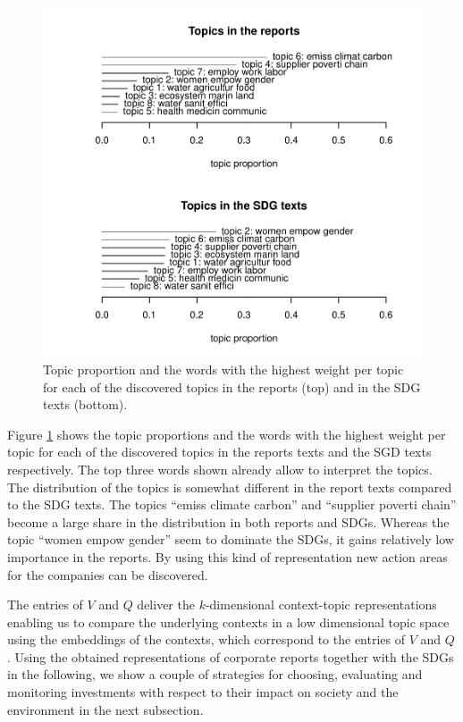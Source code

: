 \documentclass[
]{article}
\begin{document}
\begin{figure}
\includegraphics[width=0.8\linewidth]{20240314_sustain_dim_files/figure-latex/figtpropg-1} \caption{Topic proportion and the words with the highest weight per topic for each of the discovered topics in the reports (top) and in the SDG texts (bottom).}\label{fig:figtpropg}
\end{figure}

Figure \ref{fig:figtpropg} shows the topic proportions and the words with the highest weight per topic for each of the discovered topics in the reports texts and the SGD texts respectively. The top three words shown already allow to interpret the topics. The distribution of the topics is somewhat different in the report texts compared to the SDG texts. The topics ``emiss climate carbon'' and ``supplier poverti chain'' become a large share in the distribution in both reports and SDGs. Whereas the topic ``women empow gender'' seem to dominate the SDGs, it gains relatively low importance in the reports. By using this kind of representation new action areas for the companies can be discovered.

The entries of \(V\) and \(Q\) deliver the \(k\)-dimensional context-topic representations enabling us to compare the underlying contexts in a low dimensional topic space using the embeddings of the contexts, which correspond to the entries of \(V\) and \(Q\).
Using the obtained representations of corporate reports together with the SDGs in the following, we show a couple of strategies for choosing, evaluating and monitoring investments with respect to their impact on society and the environment in the next subsection.
\end{document}
